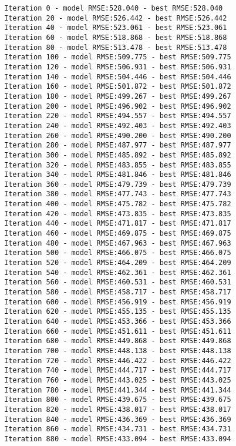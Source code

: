 \documentclass[11pt]{article}
\begin{document}
    \begin{Verbatim}[commandchars=\\\{\},fontsize=\small]
Iteration 0 - model RMSE:528.040 - best RMSE:528.040
Iteration 20 - model RMSE:526.442 - best RMSE:526.442
Iteration 40 - model RMSE:523.061 - best RMSE:523.061
Iteration 60 - model RMSE:518.868 - best RMSE:518.868
Iteration 80 - model RMSE:513.478 - best RMSE:513.478
Iteration 100 - model RMSE:509.775 - best RMSE:509.775
Iteration 120 - model RMSE:506.931 - best RMSE:506.931
Iteration 140 - model RMSE:504.446 - best RMSE:504.446
Iteration 160 - model RMSE:501.872 - best RMSE:501.872
Iteration 180 - model RMSE:499.267 - best RMSE:499.267
Iteration 200 - model RMSE:496.902 - best RMSE:496.902
Iteration 220 - model RMSE:494.557 - best RMSE:494.557
Iteration 240 - model RMSE:492.403 - best RMSE:492.403
Iteration 260 - model RMSE:490.200 - best RMSE:490.200
Iteration 280 - model RMSE:487.977 - best RMSE:487.977
Iteration 300 - model RMSE:485.892 - best RMSE:485.892
Iteration 320 - model RMSE:483.855 - best RMSE:483.855
Iteration 340 - model RMSE:481.846 - best RMSE:481.846
Iteration 360 - model RMSE:479.739 - best RMSE:479.739
Iteration 380 - model RMSE:477.743 - best RMSE:477.743
Iteration 400 - model RMSE:475.782 - best RMSE:475.782
Iteration 420 - model RMSE:473.835 - best RMSE:473.835
Iteration 440 - model RMSE:471.817 - best RMSE:471.817
Iteration 460 - model RMSE:469.875 - best RMSE:469.875
Iteration 480 - model RMSE:467.963 - best RMSE:467.963
Iteration 500 - model RMSE:466.075 - best RMSE:466.075
Iteration 520 - model RMSE:464.209 - best RMSE:464.209
Iteration 540 - model RMSE:462.361 - best RMSE:462.361
Iteration 560 - model RMSE:460.531 - best RMSE:460.531
Iteration 580 - model RMSE:458.717 - best RMSE:458.717
Iteration 600 - model RMSE:456.919 - best RMSE:456.919
Iteration 620 - model RMSE:455.135 - best RMSE:455.135
Iteration 640 - model RMSE:453.366 - best RMSE:453.366
Iteration 660 - model RMSE:451.611 - best RMSE:451.611
Iteration 680 - model RMSE:449.868 - best RMSE:449.868
Iteration 700 - model RMSE:448.138 - best RMSE:448.138
Iteration 720 - model RMSE:446.422 - best RMSE:446.422
Iteration 740 - model RMSE:444.717 - best RMSE:444.717
Iteration 760 - model RMSE:443.025 - best RMSE:443.025
Iteration 780 - model RMSE:441.344 - best RMSE:441.344
Iteration 800 - model RMSE:439.675 - best RMSE:439.675
Iteration 820 - model RMSE:438.017 - best RMSE:438.017
Iteration 840 - model RMSE:436.369 - best RMSE:436.369
Iteration 860 - model RMSE:434.731 - best RMSE:434.731
Iteration 880 - model RMSE:433.094 - best RMSE:433.094

\end{Verbatim}
\end{document}

